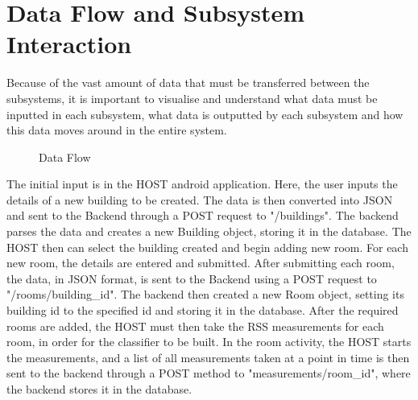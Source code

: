 \section{Data Flow and Subsystem Interaction}
Because of the vast amount of data that must be transferred between the subsystems, it is important to visualise and understand what data must be inputted in each subsystem, what data is outputted by each subsystem and how this data moves around in the entire system.
\begin{figure}
\noindent{}
\caption{Data Flow}
\end{figure}
The initial input is in the HOST android application. Here, the user inputs the details of a new building to be created. The data is then converted into JSON and sent to the Backend through a POST request to "/buildings". The backend parses the data and creates a new Building object, storing it in the database. The HOST then can select the building created and begin adding new room. For each new room, the details are entered and submitted. After submitting each room, the data, in JSON format, is sent to the Backend using a POST request to "/rooms/building\_id". The backend then created a new Room object, setting its building id to the specified id and storing it in the database. After the required rooms are added, the HOST must then take the RSS measurements for each room, in order for the classifier to be built. In the room activity, the HOST starts the measurements, and a list of all measurements taken at a point in time is then sent to the backend through a POST method to "measurements/room\_id", where the backend stores it in the database.
